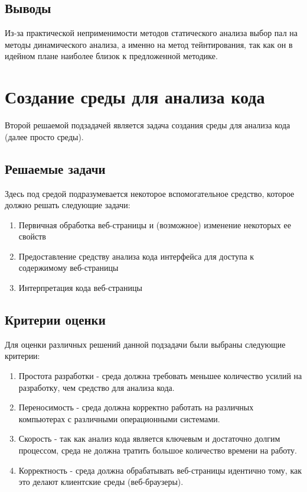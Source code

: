 \subsection{Выводы}
	Из-за практической неприменимости методов статического анализа выбор пал на методы динамического анализа, а именно на метод тейнтирования, так как он в идейном плане наиболее близок к предложенной методике.


\section{Создание среды для анализа кода}
Второй решаемой подзадачей является задача создания среды для анализа кода (далее просто среды).

\subsection{Решаемые задачи}
	Здесь под средой подразумевается некоторое вспомогательное средство, которое должно решать следующие задачи:

	\begin{enumerate}
		\item Первичная обработка веб-страницы и (возможное) изменение некоторых ее свойств
		\item Предоставление средству анализа кода интерфейса для доступа к содержимому веб-страницы
		\item Интерпретация кода веб-страницы
	\end{enumerate}

\subsection{Критерии оценки}
	Для оценки различных решений данной подзадачи были выбраны следующие критерии:

	\begin{enumerate}
		\item Простота разработки - среда должна требовать меньшее количество усилий на разработку, чем средство для анализа кода.
		\item Переносимость - среда должна корректно работать на различных компьютерах с различными операционными системами.
		\item Скорость - так как анализ кода является ключевым и достаточно долгим процессом, среда не должна тратить большое количество времени на работу.
		\item Корректность - среда должна обрабатывать веб-страницы идентично тому, как это делают клиентские среды (веб-браузеры).
	\end{enumerate}
	\bigskip

